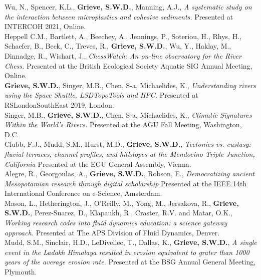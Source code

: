 \documentclass[10pt, a4paper]{article}
\newcommand{\student}{\textbf{\textsuperscript{\textdagger}}}
\newcommand{\years}[1]{\marginnote{\scriptsize #1}}
\begin{document}
\years{2021}Wu, N.\student, Spencer, K.L., \textbf{Grieve, S.W.D.}, Manning, A.J., \textit{A systematic study on the interaction between microplastics and cohesive sediments.} Presented at INTERCOH 2021, Online.\\[0.05cm]

\years{2020}Heppell C.M., Bartlett, A., Beechey, A., Jennings, P., Soteriou, H., Rhys, H., Schaefer, B., Beck, C., Treves, R., \textbf{Grieve, S.W.D.}, Wu, Y., Haklay, M., Dinnadge, R., Wishart, J., \textit{ChessWatch: An on-line observatory for the River Chess.} Presented at the British Ecological Society Aquatic SIG Annual Meeting, Online.\\[0.05cm]

\years{2019}\textbf{Grieve, S.W.D.}, Singer, M.B., Chen, S-a, Michaelides, K., \textit{Understanding rivers using the Space Shuttle, LSDTopoTools and HPC.} Presented at RSLondonSouthEast 2019, London.\\[0.05cm]

\years{2018}Singer, M.B., \textbf{Grieve, S.W.D.}, Chen, S-a, Michaelides, K., \textit{Climatic Signatures Within the World’s Rivers.} Presented at the AGU Fall Meeting, Washington, D.C.\\[0.05cm]

\years{2018}Clubb, F.J., Mudd, S.M., Hurst, M.D., \textbf{Grieve, S.W.D.}, \textit{Tectonics vs. eustasy: fluvial terraces, channel profiles, and hillslopes at the Mendocino Triple Junction, California} Presented at the EGU General Assembly, Vienna.\\[0.05cm]

\years{2018}Alegre, R., Georgoulas, A., \textbf{Grieve, S.W.D.}, Robson, E., \textit{Democratizing ancient Mesopotamian research through digital scholarship} Presented at the IEEE 14th International Conference on e-Science, Amsterdam.\\[0.05cm]

\years{2017}Mason, L., Hetherington, J., O'Reilly, M., Yong, M., Jersakova, R., \textbf{Grieve, S.W.D.}, Perez-Suarez, D., Klapaukh, R., Craster, R.V. and Matar, O.K., \textit{Working research codes into fluid dynamics education: a science gateway approach.} Presented at The APS Division of Fluid Dynamics, Denver.\\[0.05cm]

\years{2016}Mudd, S.M., Sinclair, H.D., LeDivellec, T., Dallas, K., \textbf{Grieve, S.W.D.}, \textit{A single event in the Ladakh Himalaya resulted in erosion equivalent to grater than 1000 years of the average erosion rate.} Presented at the BSG Annual General Meeting, Plymouth.\\[0.05cm]
\end{document}
